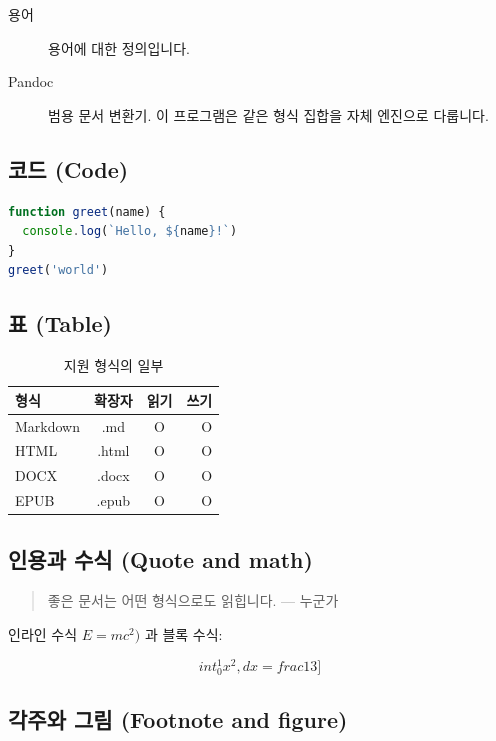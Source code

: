 \documentclass[11pt]{article}
\begin{document}
\begin{description}
\item[용어] 용어에 대한 정의입니다.
\item[Pandoc] 범용 문서 변환기. 이 프로그램은 같은 형식 집합을 자체 엔진으로 다룹니다.
\end{description}

\subsection*{코드 (Code)}\label{코드-code}

\begin{lstlisting}[language=js]
function greet(name) {
  console.log(`Hello, ${name}!`)
}
greet('world')
\end{lstlisting}

\subsection*{표 (Table)}\label{표-table}

\begin{table}[htbp]
\centering
\begin{tabular}{lccr}
\toprule
형식 & 확장자 & 읽기 & 쓰기 \\
\midrule
Markdown & .md & O & O \\
HTML & .html & O & O \\
DOCX & .docx & O & O \\
EPUB & .epub & O & O \\
\bottomrule
\end{tabular}
\caption{지원 형식의 일부}
\end{table}

\subsection*{인용과 수식 (Quote and math)}\label{인용과-수식-quote-and-math}

\begin{quote}
좋은 문서는 어떤 형식으로도 읽힙니다. --- 누군가
\end{quote}

인라인 수식 $E = mc^2)$ 과 블록 수식:

\[int_0^1 x^2,dx = frac{1}{3}]\]

\subsection*{각주와 그림 (Footnote and figure)}\label{각주와-그림-footnote-and-figure}
\end{document}
